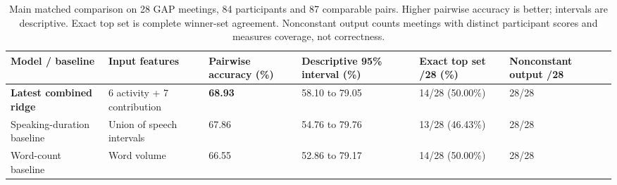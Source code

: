 \documentclass[journal]{IEEEtran}
\begin{document}
\begin{table}[t]
\caption{Main matched comparison on 28 GAP meetings, 84 participants and 87 comparable pairs. Higher pairwise accuracy is better; intervals are descriptive. Exact top set is complete winner-set agreement. Nonconstant output counts meetings with distinct participant scores and measures coverage, not correctness.}
\label{tab:4}
\centering\footnotesize
\setlength{\tabcolsep}{3pt}
\renewcommand{\arraystretch}{1.13}
\begin{tabular}{p{}p{}p{}p{}p{}p{}}
\toprule
{\raggedright Model / baseline\par} & {\raggedright Input features\par} & {\raggedright Pairwise accuracy (\%)\par} & {\raggedright Descriptive 95\% interval (\%)\par} & {\raggedright Exact top set /28 (\%)\par} & {\raggedright Nonconstant output /28\par} \\
\midrule
{\raggedright \textbf{Latest combined ridge}\par} & {\raggedright 6 activity + 7 contribution\par} & {\raggedright \textbf{68.93}\par} & {\raggedright 58.10 to 79.05\par} & {\raggedright 14/28 (50.00\%)\par} & {\raggedright 28/28\par} \\
{\raggedright Speaking-duration baseline\par} & {\raggedright Union of speech intervals\par} & {\raggedright 67.86\par} & {\raggedright 54.76 to 79.76\par} & {\raggedright 13/28 (46.43\%)\par} & {\raggedright 28/28\par} \\
{\raggedright Word-count baseline\par} & {\raggedright Word volume\par} & {\raggedright 66.55\par} & {\raggedright 52.86 to 79.17\par} & {\raggedright 14/28 (50.00\%)\par} & {\raggedright 28/28\par} \\

\end{tabular}
\end{table}
\end{document}
